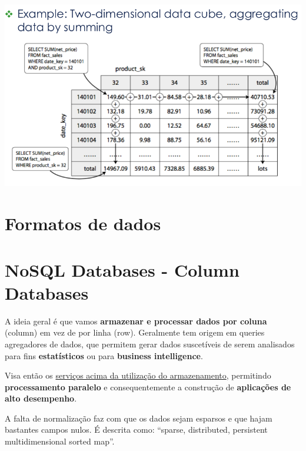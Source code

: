\documentclass{article}
\begin{document}
\begin{center}
  \includegraphics[scale=0.3]{53}
\end{center}

\section{Formatos de dados}


\pagebreak
\section{NoSQL Databases - Column Databases}

A ideia geral é que vamos \textbf{armazenar e processar dados por coluna} (column) em vez de por linha
(row). Geralmente tem origem em queries agregadores de dados, que permitem gerar
dados suscetíveis de serem analisados para fins \textbf{estatísticos} ou para \textbf{business intelligence}.

Visa então os \uline{serviços acima da utilização do armazenamento}, permitindo \textbf{processamento paralelo}
e consequentemente a construção de \textbf{aplicações de alto desempenho}.

A falta de normalização faz com que os dados sejam esparsos e que hajam bastantes campos
nulos. É descrita como: “sparse, distributed, persistent
multidimensional sorted map”.
\end{document}
